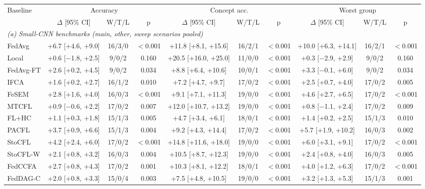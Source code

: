{\scriptsize
\begin{tabular}{l c c c c c c c c c}
\toprule
Baseline & \multicolumn{3}{c}{Accuracy} & \multicolumn{3}{c}{Concept acc.} & \multicolumn{3}{c}{Worst group} \\
\cmidrule(lr){2-4}
\cmidrule(lr){5-7}
\cmidrule(lr){8-10}
 & $\Delta$ [95\% CI] & W/T/L & p & $\Delta$ [95\% CI] & W/T/L & p & $\Delta$ [95\% CI] & W/T/L & p \\
\midrule
\multicolumn{10}{l}{\textit{(a) Small-CNN benchmarks (main, other, sweep scenarios pooled)}} \\
FedAvg & +6.7 [+4.6, +9.0] & 16/3/0 & $<$0.001 & +11.8 [+8.1, +15.6] & 16/2/1 & $<$0.001 & +10.0 [+6.3, +14.1] & 16/2/1 & $<$0.001 \\
Local & +0.6 [$-$1.8, +2.5] & 9/0/2 & 0.160 & +20.5 [+16.0, +25.0] & 11/0/0 & $<$0.001 & +0.3 [$-$2.9, +2.9] & 9/0/2 & 0.160 \\
FedAvg-FT & +2.6 [+0.2, +4.5] & 9/0/2 & 0.034 & +8.8 [+6.4, +10.6] & 10/0/1 & $<$0.001 & +3.3 [$-$0.1, +6.0] & 9/0/2 & 0.034 \\
IFCA & +1.6 [+0.2, +2.7] & 16/1/2 & 0.010 & +7.2 [+4.7, +9.7] & 17/0/2 & $<$0.001 & +2.5 [+0.7, +4.0] & 17/0/2 & 0.005 \\
FeSEM & +2.8 [+1.6, +4.0] & 16/0/3 & $<$0.001 & +9.1 [+7.1, +11.3] & 19/0/0 & $<$0.001 & +4.6 [+2.7, +6.5] & 17/0/2 & $<$0.001 \\
MTCFL & +0.9 [$-$0.6, +2.2] & 17/0/2 & 0.007 & +12.0 [+10.7, +13.2] & 19/0/0 & $<$0.001 & +0.8 [$-$1.1, +2.4] & 17/0/2 & 0.009 \\
FL+HC & +1.1 [+0.3, +1.8] & 15/1/3 & 0.005 & +4.7 [+3.4, +6.1] & 18/0/1 & $<$0.001 & +1.4 [+0.2, +2.5] & 15/1/3 & 0.010 \\
PACFL & +3.7 [+0.9, +6.6] & 15/1/3 & 0.004 & +9.2 [+4.3, +14.4] & 17/0/2 & $<$0.001 & +5.7 [+1.9, +10.2] & 16/0/3 & 0.002 \\
StoCFL & +4.2 [+2.4, +6.0] & 17/0/2 & $<$0.001 & +14.8 [+11.6, +18.0] & 19/0/0 & $<$0.001 & +6.0 [+3.1, +9.1] & 17/0/2 & $<$0.001 \\
StoCFL-W & +2.1 [+0.8, +3.2] & 16/0/3 & 0.004 & +10.5 [+8.7, +12.3] & 19/0/0 & $<$0.001 & +2.4 [+0.8, +4.0] & 16/0/3 & 0.005 \\
FedCCFA & +2.7 [+0.8, +4.3] & 17/0/2 & 0.001 & +10.3 [+8.1, +12.2] & 18/0/1 & $<$0.001 & +4.0 [+1.2, +6.3] & 17/0/2 & $<$0.001 \\
FedDAG-C & +2.0 [+0.8, +3.3] & 15/0/4 & 0.003 & +7.5 [+4.8, +10.5] & 19/0/0 & $<$0.001 & +3.2 [+1.3, +5.3] & 15/1/3 & 0.001 \\

\end{tabular}}

